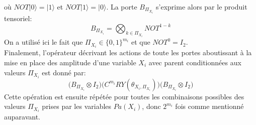 où $NOT|0\rangle = |1\rangle$ et $NOT|1\rangle = |0\rangle$. 
La porte $B_{\Pi_{X_i}}$ s'exprime alors par le produit tensoriel:
\[B_{\Pi_{X_i}} = \bigotimes_{k \in \Pi_{X_i}} NOT^{1-k} \]
On a utilisé ici le fait que $\Pi_{X_i} \in \{0,1\}^{m_i}$ et que $NOT^0 = I_2$. 
\\
Finalement, l'opérateur décrivant les actions de toute les portes aboutissant à la mise en place des amplitude d'une variable $X_i$ avec parent conditionnées aux valeurs $\Pi_{X_i}$ est donné par: 
\[
\big(B_{\Pi_{X_i}} \!\! \otimes I_2 \big)
\big(C^{m_i}RY(\theta_{X_i, \Pi_{X_i}})\big)
\big(B_{\Pi_{X_i}} \!\! \otimes I_2 \big)
\]
Cette opération est ensuite répétée pour toutes les combinaisons possibles des valeurs $\Pi_{X_i}$ prises par les variables $Pa(X_i)$, donc $2^{m_i}$ fois comme mentionné auparavant.

